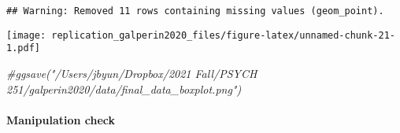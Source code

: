 \documentclass[]{article}
\newenvironment{Shaded}{\begin{snugshade}}{\end{snugshade}}
\newcommand{\CommentTok}[1]{\textcolor[rgb]{0.56,0.35,0.01}{\textit{#1}}}
\newcommand{\KeywordTok}[1]{\textcolor[rgb]{0.13,0.29,0.53}{\textbf{#1}}}
\newcommand{\NormalTok}[1]{#1}
\newcommand{\OperatorTok}[1]{\textcolor[rgb]{0.81,0.36,0.00}{\textbf{#1}}}
\newcommand{\StringTok}[1]{\textcolor[rgb]{0.31,0.60,0.02}{#1}}
\let\oldparagraph\paragraph
\renewcommand{\paragraph}[1]{\oldparagraph{#1}\mbox{}}
\begin{document}
\begin{verbatim}
## Warning: Removed 11 rows containing missing values (geom_point).
\end{verbatim}

\texttt{[image: replication\_galperin2020\_files/figure-latex/unnamed-chunk-21-1.pdf]}

\begin{Shaded}
\begin{Highlighting}[]
\CommentTok{#ggsave("/Users/jbyun/Dropbox/2021 Fall/PSYCH 251/galperin2020/data/final_data_boxplot.png")}
\end{Highlighting}
\end{Shaded}

\hypertarget{manipulation-check}{%
\paragraph{Manipulation check}\label{manipulation-check}}

\begin{Shaded}
\end{Shaded}
\end{document}
